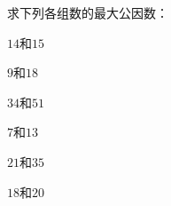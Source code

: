 求下列各组数的最大公因数：

$14$和$15$		
    
\vspace{60 pt}
$9$和$18$
    
\vspace{60 pt}
$34$和$51$
    
\vspace{60 pt}
$7$和$13$
    
\vspace{60 pt}
$21$和$35$
    
\vspace{60 pt}
$18$和$20$